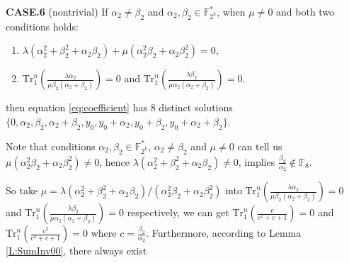 \documentclass[runningheads,a4paper]{article}
\newcommand{\F}{\mathbb{F}}
\newcommand{\0}{\textbf{0}}
\newcommand{\1}{\textbf{1}}
\renewcommand{\Tr}{\mathrm{Tr}_1^n}
\begin{document}
    
    \textbf{CASE.6} (nontrivial)
    If $ \alpha_2\ne\beta_2 $ and $ \alpha_2,\beta_2\in\F_{2^k}^* $, when $ \mu\ne 0 $ and both two conditions holds: 
    \begin{enumerate}[label=\arabic{*})]
        \item $ \lambda(\alpha_2^2+\beta_2^2+\alpha_2\beta_2)+\mu(\alpha_2^2\beta_2+\alpha_2\beta_2^2)= 0 $,
        \item $ \Tr\left(\frac{\lambda\alpha_2}{\mu\beta_2(\alpha_2+\beta_2)}\right)=0 $ and $ \Tr\left(\frac{\lambda\beta_2}{\mu\alpha_2(\alpha_2+\beta_2)}\right)=0  $. 
    \end{enumerate}
    then equation \eqref{eq:coefficient} has $ 8 $ distinct solutions 
    $ \{0,\alpha_2,\beta_2,\alpha_2+\beta_2,y_0,y_0+\alpha_2,y_0+\beta_2,y_0+\alpha_2+\beta_2\} $.
    
    Note that conditions $ \alpha_2,\beta_2\in\F_{2^k}^* $, $ \alpha_2\ne\beta_2 $ and $ \mu\ne 0 $ 
    can tell us $ \mu(\alpha_2^2\beta_2+\alpha_2\beta_2^2)\ne 0 $, 
    hence $ \lambda(\alpha_2^2+\beta_2^2+\alpha_2\beta_2)\ne 0 $, 
    implies $ \frac{\beta_2}{\alpha_2}\notin\F_8 $. 

    So take $ \mu=\lambda(\alpha_2^2+\beta_2^2+\alpha_2\beta_2)/(\alpha_2^2\beta_2+\alpha_2\beta_2^2) $ 
    into $ \Tr\left(\frac{\lambda\alpha_2}{\mu\beta_2(\alpha_2+\beta_2)}\right)=0 $ 
    and $ \Tr\left(\frac{\lambda\beta_2}{\mu\alpha_2(\alpha_2+\beta_2)}\right)=0  $ respectively, we can get 
    $ \Tr\left(\frac{c}{c^2+c+1}\right)=0 $ and $ \Tr\left(\frac{c^2}{c^2+c+1}\right)=0 $ 
    where $ c=\frac{\beta_2}{\alpha_2} $. Furthermore, according to Lemma \ref{L:SumInv00},  there always exist 
\end{document}
